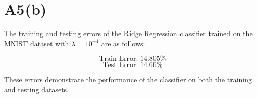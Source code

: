 \documentclass{article}
\begin{document}
\section*{A5(b)}

The training and testing errors of the Ridge Regression classifier trained on the MNIST dataset with \(\lambda = 10^{-4}\) are as follows:

\[
\text{Train Error: } 14.805\%
\]
\[
\text{Test Error: } 14.66\%
\]

These errors demonstrate the performance of the classifier on both the training and testing datasets.
\end{document}
